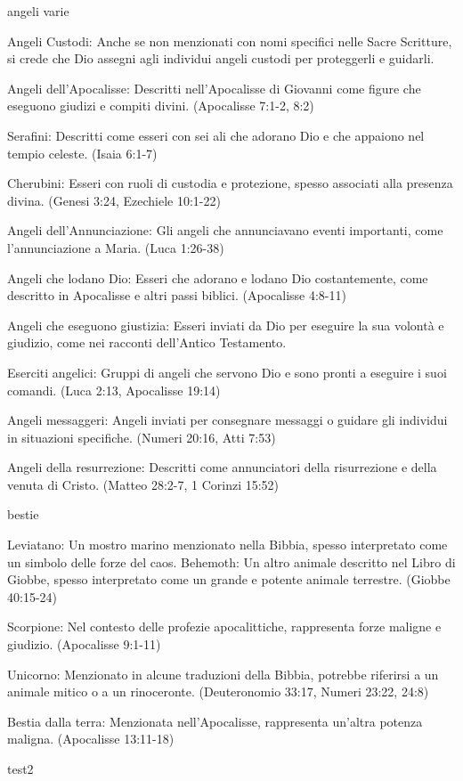 \documentclass[12pt,a4paper,twoside,openany]{book}
\begin{document}
angeli varie

Angeli Custodi: Anche se non menzionati con nomi specifici nelle Sacre Scritture, si crede che Dio assegni agli individui angeli custodi per proteggerli e guidarli.

Angeli dell'Apocalisse: Descritti nell'Apocalisse di Giovanni come figure che eseguono giudizi e compiti divini. (Apocalisse 7:1-2, 8:2)

Serafini: Descritti come esseri con sei ali che adorano Dio e che appaiono nel tempio celeste. (Isaia 6:1-7)

Cherubini: Esseri con ruoli di custodia e protezione, spesso associati alla presenza divina. (Genesi 3:24, Ezechiele 10:1-22)

Angeli dell'Annunciazione: Gli angeli che annunciavano eventi importanti, come l'annunciazione a Maria. (Luca 1:26-38)

Angeli che lodano Dio: Esseri che adorano e lodano Dio costantemente, come descritto in Apocalisse e altri passi biblici. (Apocalisse 4:8-11)

Angeli che eseguono giustizia: Esseri inviati da Dio per eseguire la sua volontà e giudizio, come nei racconti dell'Antico Testamento.

Eserciti angelici: Gruppi di angeli che servono Dio e sono pronti a eseguire i suoi comandi. (Luca 2:13, Apocalisse 19:14)

Angeli messaggeri: Angeli inviati per consegnare messaggi o guidare gli individui in situazioni specifiche. (Numeri 20:16, Atti 7:53)

Angeli della resurrezione: Descritti come annunciatori della risurrezione e della venuta di Cristo. (Matteo 28:2-7, 1 Corinzi 15:52)

bestie


Leviatano: Un mostro marino menzionato nella Bibbia, spesso interpretato come un simbolo delle forze del caos.
Behemoth: Un altro animale descritto nel Libro di Giobbe, spesso interpretato come un grande e potente animale terrestre. (Giobbe 40:15-24)

Scorpione: Nel contesto delle profezie apocalittiche, rappresenta forze maligne e giudizio. (Apocalisse 9:1-11)

Unicorno: Menzionato in alcune traduzioni della Bibbia, potrebbe riferirsi a un animale mitico o a un rinoceronte. (Deuteronomio 33:17, Numeri 23:22, 24:8)

Bestia dalla terra: Menzionata nell'Apocalisse, rappresenta un'altra potenza maligna. (Apocalisse 13:11-18)

test2

{\small \printindex}
\end{document}
